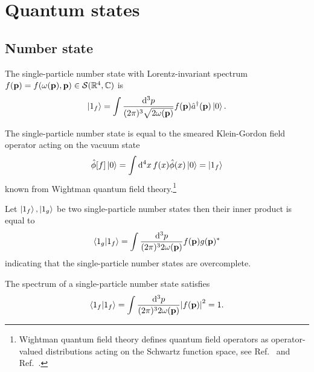 \section{Quantum states}

\subsection{Number state}

\begin{definition}\label{def:single_particle_number_state}
	The single-particle number state with Lorentz-invariant spectrum $f(\vb{p})=f(\omega(\vb{p}),\vb{p})\in\mathcal{S}(\mathbb{R}^4,\mathbb{C})$ is
	\begin{equation}
		\ket{1_f}
		=
		\int\frac{\dd[3]{p}}{(2\pi)^3\sqrt{2\omega(\vb{p})}}
		f(\vb{p})
		\hat{a}^\dagger(\vb{p})
		\ket{0}
		.
	\end{equation}
\end{definition}
\begin{lemma}\label{thm:single_particle_number_state_smeared_kg}
	The single-particle number state is equal to the smeared Klein-Gordon field operator acting on the vacuum state
	\begin{equation}
		\hat\phi[f]
		\ket{0}
		=
		\int\dd[4]{x}
		f(x)
		\hat\phi(x)
		\ket{0}
		=
		\ket{1_f}
	\end{equation}
	known from Wightman quantum field theory.\footnote{Wightman quantum field theory defines quantum field operators as operator-valued distributions acting on the Schwartz function space, see Ref.~\cite{Bogolubov1989} and Ref.~\cite{Streater2016}.}
\end{lemma}
\begin{lemma}\label{th:single_particle_number_states_inner_product}
	Let $\ket{1_f},\ket{1_g}$ be two single-particle number states then their inner product is equal to
	\begin{equation}
		\braket{1_g}{1_f}
		=
		\int\frac{\dd[3]{p}}{(2\pi)^32\omega(\vb{p})}
		f(\vb{p})g(\vb{p})^*
	\end{equation}
	indicating that the single-particle number states are overcomplete.
\end{lemma}
\begin{lemma}\label{thm:single_particle_number_state_normalization}
	The spectrum of a single-particle number state satisfies
	\begin{equation}
		\bra{1_f}\ket{1_f}
		=
		\int\frac{\dd[3]{p}}{(2\pi)^32\omega(\vb{p})}
		\abs{f(\vb{p})}^2
		=
		1
		.
	\end{equation}
\end{lemma}
